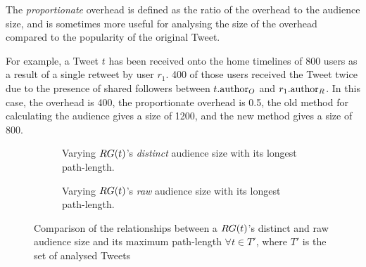  The \textit{proportionate} overhead is defined as the ratio of the overhead to the audience size, and is sometimes more useful for analysing the size of the overhead compared to the popularity of the original Tweet.

For example, a Tweet $t$ has been received onto the home timelines of 800 users as a result of a single retweet by user $r_1$. 400 of those users received the Tweet twice due to the presence of shared followers between $t.\textrm{author}_O$ and $r_1.\textrm{author}_R$. In this case, the overhead is 400, the proportionate overhead is 0.5, the old method for calculating the audience gives a size of 1200, and the new method gives a size of 800.

\begin{figure}[h]
\begin{subfigure}{.5\textwidth}
    \centering
    \caption{Varying $RG(t)$'s \textit{distinct} audience size with its longest path-length.}
    \label{fig:pathlength-audience}
\end{subfigure}
\quad
\begin{subfigure}{.5\textwidth}
    \centering
    \caption{Varying $RG(t)$'s \textit{raw} audience size with its longest path-length.}
    \label{fig:pathlength-rawaudience}
\end{subfigure}
\caption{Comparison of the relationships between a $RG(t)$'s distinct and raw audience size and its maximum path-length $\forall t \in T'$, where $T'$ is the set of analysed Tweets}
\end{figure}

